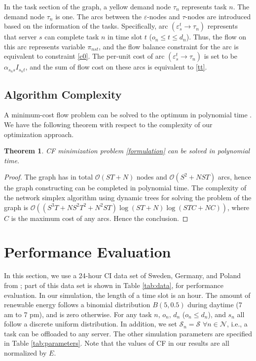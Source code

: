 \documentclass[conference, 10pt, ﬁnal, letterpaper, twocolumn]{IEEEtran}
\newtheorem{theorem}{Theorem}
\begin{document}
In the task section of the graph, a yellow demand node $\tau_n$ represents task $n$. The demand node $\tau_n$ is one. The arcs between the $\varepsilon$-nodes and $\tau$-nodes are introduced based on the information of the tasks. Specifically, arc $(\varepsilon^{t}_{s}\rightarrow\tau_{n})$ represents that server $s$ can complete task $n$ in time slot $t$ ($o_n \leq t \leq d_n$). Thus, the flow on this arc represents variable $\pi_{nst}$, and the flow balance constraint for the arc is equivalent to constraint \eqref{c0}.
The per-unit cost of arc $(\varepsilon^{t}_{s}\rightarrow\tau_n)$ is set to be $\alpha_{s_{n}s}I_{s_{n}t}$, and the sum of flow cost on these arcs is equivalent to \eqref{tt}.

\subsection{Algorithm Complexity}

A minimum-cost flow problem can be solved to the optimum in polynomial time \cite{10.5555/137406}. We have the following theorem with respect to the complexity of our optimization approach.

\begin{theorem}
CF minimization problem \eqref{formulation} can be solved in polynomial time.
\end{theorem}
\begin{proof}
The graph has in total $\mathcal{O}(ST + N)$ nodes and $\mathcal{O}(S^2 + NST)$ arcs, hence the graph constructing can be completed in polynomial time. The complexity of the network simplex algorithm using dynamic trees \cite{tarjan1997dynamic} for solving the problem of the graph is $\mathcal{O}((S^3T + NS^2 T^2+N^2ST)\log(ST + N)\log(STC + NC))$, where $C$ is the maximum cost of any arcs. Hence the conclusion.
\end{proof}


\section{Performance Evaluation}

In this section, we use a 24-hour CI data set of Sweden, Germany, and Poland from \cite{ElectricityMaps}; part of this data set is shown in Table \ref{tab:data}, for performance evaluation. In our simulation, the length of a time slot is an hour. The amount of renewable energy follows a binomial distribution $B(5, 0.5)$ during daytime (7 am to 7 pm), and is zero otherwise. For any task $n$, $o_{n}$, $d_n$ ($o_n \leq d_n$), and $s_n$ all follow a discrete uniform distribution. In addition, we set $\mathcal{S}_n = \mathcal{S}$ $\forall n \in \mathcal{N}$, i.e., a task can be offloaded to any server. The other simulation parameters are specified in Table \ref{tab:parameters}. Note that the values of CF in our results are all normalized by $E$. 
\end{document}
